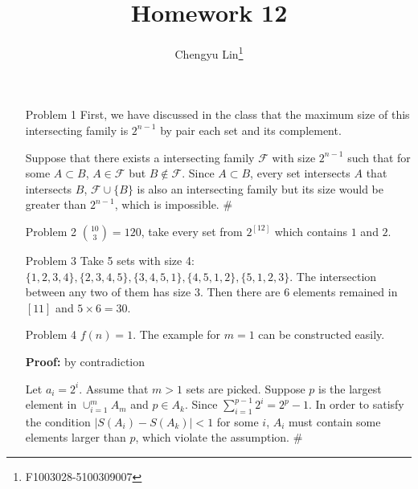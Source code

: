 \documentclass{article}
\title{Homework 12}
\author{Chengyu Lin\footnote{F1003028-5100309007}}
\date{}
\begin{document}
\maketitle

\begin{itemize}
    \item[Problem 1]
        First, we have discussed in the class that the maximum
        size of this intersecting family is $2^{n-1}$ by pair
        each set and its complement.

        Suppose that there exists a intersecting family $\mathcal{F}$
        with size $2^{n-1}$ such that for some $A \subset B$, 
        $A \in \mathcal{F}$ but $B \not\in \mathcal{F}$.
        Since $A \subset B$, every set intersects $A$ that intersects
        $B$, $\mathcal{F} \cup \{B\}$ is also an intersecting
        family but its size would be greater than $2^{n-1}$,
        which is impossible. \#

    \item[Problem 2]
        ${10 \choose 3} = 120$, take every set from $2^{[12]}$
        which contains $1$ and $2$.

    \item[Problem 3]
        Take 5 sets with size 4: $\{1,2,3,4\}, \{2,3,4,5\},
        \{3,4,5,1\}, \{4,5,1,2\}, \{5,1,2,3\}$. The intersection
        between any two of them has size 3. Then there are
        6 elements remained in $[11]$ and $5 \times 6=30$.

    \item[Problem 4]
        $f(n) = 1$. The example for $m = 1$ can be constructed
        easily.

        \textbf{Proof:} by contradiction

        Let $a_i = 2^i$. Assume that $m>1$ sets are picked.
        Suppose $p$ is the largest element in
        $\cup_{i=1}^{m} A_m$ and $p \in A_k$.
        Since $\sum_{i=1}^{p-1} 2^i = 2^p - 1$. In order to satisfy
        the condition $|S(A_i) - S(A_k)| < 1$ for some $i$,
        $A_i$ must contain some elements larger than $p$,
        which violate the assumption. \#

\end{itemize}
\end{document}
